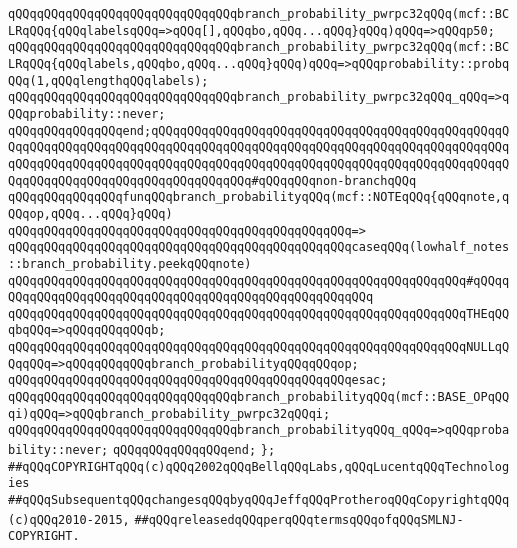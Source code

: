 \verb|qQQqqQQqqQQqqQQqqQQqqQQqqQQqqQQqbranch_probability_pwrpc32qQQq(mcf::BCLRqQQq{qQQqlabelsqQQq=>qQQq[],qQQqbo,qQQq...qQQq}qQQq)qQQq=>qQQqp50;|\newline
\verb|qQQqqQQqqQQqqQQqqQQqqQQqqQQqqQQqbranch_probability_pwrpc32qQQq(mcf::BCLRqQQq{qQQqlabels,qQQqbo,qQQq...qQQq}qQQq)qQQq=>qQQqprobability::probqQQq(1,qQQqlengthqQQqlabels);|\newline
\verb|qQQqqQQqqQQqqQQqqQQqqQQqqQQqqQQqbranch_probability_pwrpc32qQQq_qQQq=>qQQqprobability::never;|\newline
\verb|qQQqqQQqqQQqqQQqend;qQQqqQQqqQQqqQQqqQQqqQQqqQQqqQQqqQQqqQQqqQQqqQQqqQQqqQQqqQQqqQQqqQQqqQQqqQQqqQQqqQQqqQQqqQQqqQQqqQQqqQQqqQQqqQQqqQQqqQQqqQQqqQQqqQQqqQQqqQQqqQQqqQQqqQQqqQQqqQQqqQQqqQQqqQQqqQQqqQQqqQQqqQQqqQQqqQQqqQQqqQQqqQQqqQQqqQQqqQQqqQQq#qQQqqQQqnon-branchqQQq|\newline
\newline
\verb|qQQqqQQqqQQqqQQqfunqQQqbranch_probabilityqQQq(mcf::NOTEqQQq{qQQqnote,qQQqop,qQQq...qQQq}qQQq)|\newline
\verb|qQQqqQQqqQQqqQQqqQQqqQQqqQQqqQQqqQQqqQQqqQQqqQQq=>|\newline
\verb|qQQqqQQqqQQqqQQqqQQqqQQqqQQqqQQqqQQqqQQqqQQqqQQqcaseqQQq(lowhalf_notes::branch_probability.peekqQQqnote)|\newline
\verb|qQQqqQQqqQQqqQQqqQQqqQQqqQQqqQQqqQQqqQQqqQQqqQQqqQQqqQQqqQQqqQQq#qQQqqQQqqQQqqQQqqQQqqQQqqQQqqQQqqQQqqQQqqQQqqQQqqQQqqQQq|\newline
\verb|qQQqqQQqqQQqqQQqqQQqqQQqqQQqqQQqqQQqqQQqqQQqqQQqqQQqqQQqqQQqqQQqTHEqQQqbqQQq=>qQQqqQQqqQQqb;|\newline
\verb|qQQqqQQqqQQqqQQqqQQqqQQqqQQqqQQqqQQqqQQqqQQqqQQqqQQqqQQqqQQqqQQqNULLqQQqqQQq=>qQQqqQQqqQQqbranch_probabilityqQQqqQQqop;|\newline
\verb|qQQqqQQqqQQqqQQqqQQqqQQqqQQqqQQqqQQqqQQqqQQqqQQqesac;|\newline
\newline
\verb|qQQqqQQqqQQqqQQqqQQqqQQqqQQqqQQqbranch_probabilityqQQq(mcf::BASE_OPqQQqi)qQQq=>qQQqbranch_probability_pwrpc32qQQqi;|\newline
\verb|qQQqqQQqqQQqqQQqqQQqqQQqqQQqqQQqbranch_probabilityqQQq_qQQq=>qQQqprobability::never;|\newline
\verb|qQQqqQQqqQQqqQQqend;|\newline
\newline
\verb|};|\newline
\newline
\newline
\verb|##qQQqCOPYRIGHTqQQq(c)qQQq2002qQQqBellqQQqLabs,qQQqLucentqQQqTechnologies|\newline
\verb|##qQQqSubsequentqQQqchangesqQQqbyqQQqJeffqQQqProtheroqQQqCopyrightqQQq(c)qQQq2010-2015,|\newline
\verb|##qQQqreleasedqQQqperqQQqtermsqQQqofqQQqSMLNJ-COPYRIGHT.|\newline

